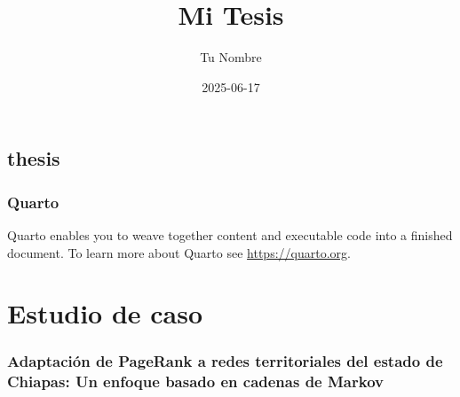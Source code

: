 \documentclass[
  letterpaper,
  DIV=11,
  numbers=noendperiod]{scrreprt}
\title{Mi Tesis}
\author{Tu Nombre}
\date{2025-06-17}
\renewcommand*\contentsname{Table of contents}
\newcommand\contentsname{Table of contents}
\begin{document}
\maketitle

\renewcommand*\contentsname{Table of contents}
{
\hypersetup{linkcolor=}
\setcounter{tocdepth}{2}
\tableofcontents
}


\chapter{thesis}\label{thesis}

\section{Quarto}\label{quarto}

Quarto enables you to weave together content and executable code into a
finished document. To learn more about Quarto see
\url{https://quarto.org}.


\chapter{}\label{section}


\chapter{}\label{section-1}

\part{Estudio de caso}

\section*{Adaptación de PageRank a redes territoriales del estado de
Chiapas: Un enfoque basado en cadenas de
Markov}\label{adaptaciuxf3n-de-pagerank-a-redes-territoriales-del-estado-de-chiapas-un-enfoque-basado-en-cadenas-de-markov}

\end{document}
